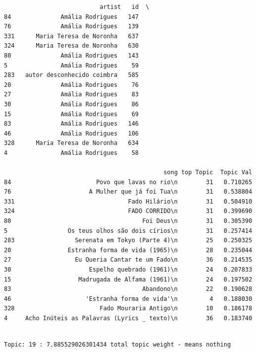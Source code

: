 \documentclass[11pt]{article}
\begin{document}
    
    \begin{verbatim}
                           artist   id  \
84              Amália Rodrigues   147   
76              Amália Rodrigues   139   
331      Maria Teresa de Noronha   637   
324      Maria Teresa de Noronha   630   
80              Amália Rodrigues   143   
5               Amália Rodrigues    59   
283   autor desconhecido coimbra   585   
20              Amália Rodrigues    76   
27              Amália Rodrigues    83   
30              Amália Rodrigues    86   
15              Amália Rodrigues    69   
83              Amália Rodrigues   146   
46              Amália Rodrigues   106   
328      Maria Teresa de Noronha   634   
4               Amália Rodrigues    58   

                                             song top Topic  Topic Val  
84                        Povo que lavas no rio\n        31   0.710265  
76                      A Mulher que já foi Tua\n        31   0.538804  
331                                Fado Hilário\n        31   0.504910  
324                                FADO CORRIDO\n        31   0.399690  
80                                     Foi Deus\n        31   0.305390  
5                 Os teus olhos são dois círios\n        31   0.257414  
283                 Serenata em Tokyo (Parte 4)\n        25   0.250325  
20                Estranha forma de vida (1965)\n        28   0.235044  
27                  Eu Queria Cantar te um Fado\n        36   0.214535  
30                      Espelho quebrado (1961)\n        24   0.207833  
15                   Madrugada de Alfama (1961)\n        24   0.197502  
83                                     Abandono\n        22   0.190628  
46                     'Estranha forma de vida'\n         4   0.188030  
328                        Fado Mouraria Antigo\n        10   0.186178  
4     Acho Inúteis as Palavras (Lyrics _ texto)\n        36   0.183740  
    \end{verbatim}

    
    \begin{Verbatim}[commandchars=\\\{\}]

Topic: 19 : 7.885529026301434 total topic weight - means nothing

    \end{Verbatim}
\end{document}
